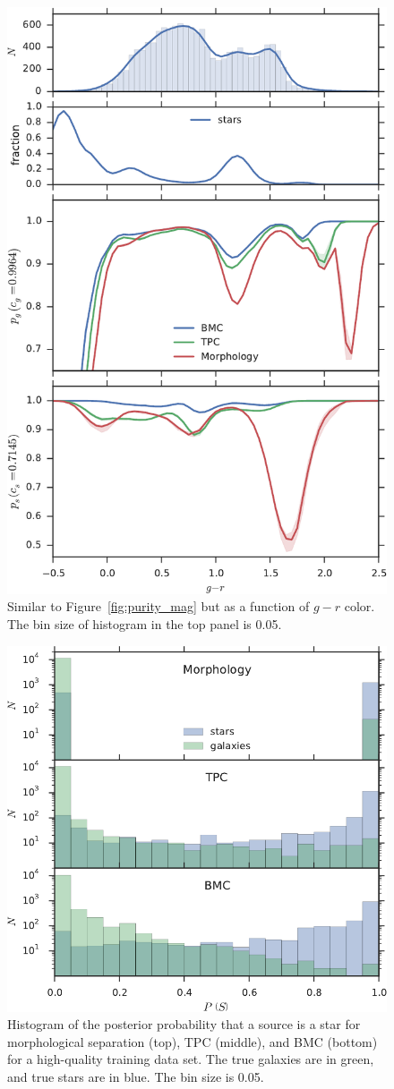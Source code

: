\begin{figure}[htp]
  \centering
  \includegraphics[width=0.7\linewidth]{figures/purity_g_r.pdf}
  \caption{Similar to Figure~\ref{fig:purity_mag}
           but as a function of $g-r$ color.
           The bin size of histogram in the top panel is 0.05.}
  \label{fig:purity_g_r}
\end{figure}

\begin{figure}[htp]
  \centering
  \includegraphics[width=0.7\linewidth]{figures/p_dist.pdf}
  \caption{Histogram of the posterior probability that
           a source is a star for morphological separation (top),
           TPC (middle), and BMC (bottom)
           for a high-quality training data set.
           The true galaxies are in green, and true stars are in blue.
           The bin size is 0.05.}
  \label{fig:p_dist_all}
\end{figure}


